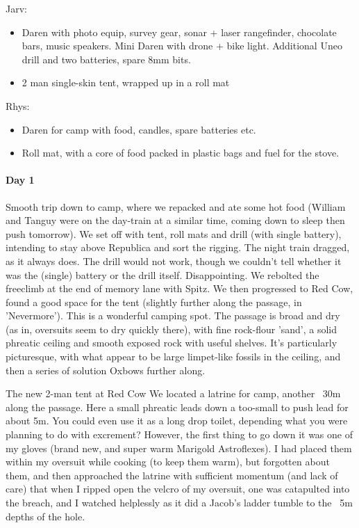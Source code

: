 Jarv:
\begin{itemize}
\item Daren with photo equip, survey gear, sonar + laser rangefinder, chocolate bars, music speakers. Mini Daren with drone + bike light. Additional Uneo drill and two batteries, spare 8mm bits.
\item 2 man single-skin tent, wrapped up in a roll mat
\end{itemize}

Rhys:
\begin{itemize}
\item Daren for camp with food, candles, spare batteries etc.
\item Roll mat, with a core of food packed in plastic bags and fuel for the stove.
\end{itemize}


\paragraph{Day 1}
Smooth trip down to camp, where we repacked and ate some hot food (William and Tanguy were on the day-train at a similar time, coming down to sleep then push tomorrow).
We set off with tent, roll mats and drill (with single battery), intending to stay above Republica and sort the rigging.
The night train dragged, as it always does. The drill would not work, though we couldn't tell whether it was the (single) battery or the drill itself. Disappointing. We rebolted the freeclimb at the end of memory lane with Spitz.
We then progressed to Red Cow, found a good space for the tent (slightly further along the passage, in 'Nevermore'). This is a wonderful camping spot. The passage is broad and dry (as in, oversuits seem to dry quickly there), with fine rock-flour 'sand', a solid phreatic ceiling and smooth exposed rock with useful shelves. It's particularly picturesque, with what appear to be large limpet-like fossils in the ceiling, and then a series of solution Oxbows further along.

The new 2-man tent at Red Cow
We located a latrine for camp, another ~30m along the passage. Here a small phreatic leads down a too-small to push lead for about 5m. You could even use it as a long drop toilet, depending what you were planning to do with excrement? However, the first thing to go down it was one of my gloves (brand new, and super warm Marigold Astroflexes). I had placed them within my oversuit while cooking (to keep them warm), but forgotten about them, and then approached the latrine with sufficient momentum (and lack of care) that when I ripped open the velcro of my oversuit, one was catapulted into the breach, and I watched helplessly as it did a Jacob's ladder tumble to the ~5m depths of the hole.

